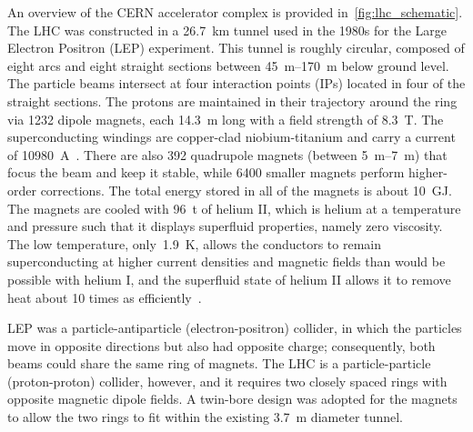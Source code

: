 An overview of the CERN accelerator complex is provided
in~\cref{fig:lhc_schematic}. The LHC was constructed in a \SI{26.7}{\km} tunnel
used in the 1980s for the Large Electron Positron (LEP) experiment. This tunnel
is roughly circular, composed of eight arcs and eight straight sections between
\SIrange{45}{170}{\meter} below ground level. The particle beams intersect at
four interaction points (IPs) located in four of the straight sections. The
protons are maintained in their trajectory around the ring via \num{1232} dipole
magnets, each \SI{14.3}{\meter} long with a field strength of \SI{8.3}{\tesla}.
The superconducting windings are copper-clad niobium-titanium and carry a
current of \SI{10980}{\ampere}~\cite{Willering:2017hrw}. There are also
\num{392} quadrupole magnets (between \SIrange{5}{7}{\meter}) that focus the
beam and keep it stable, while \num{6400} smaller magnets perform higher-order
corrections. The total energy stored in all of the magnets is about
\SI{10}{\giga\joule}. The magnets are cooled with \SI{96}{\tonne} of helium II,
which is helium at a temperature and pressure such that it displays superfluid
properties, namely zero viscosity. The low temperature, only~\SI{1.9}{\kelvin},
allows the conductors to remain superconducting at higher current densities and
magnetic fields than would be possible with helium I, and the superfluid state
of helium II allows it to remove heat about \num{10} times as
efficiently~\cite{Lebrun:1974065}.

LEP was a particle-antiparticle (electron-positron) collider, in which the
particles move in opposite directions but also had opposite charge;
consequently, both beams could share the same ring of magnets. The LHC is a
particle-particle (proton-proton) collider, however, and it requires two closely
spaced rings with opposite magnetic dipole fields. A twin-bore design was
adopted for the magnets to allow the two rings to fit within the existing
\SI{3.7}{\meter} diameter tunnel.


